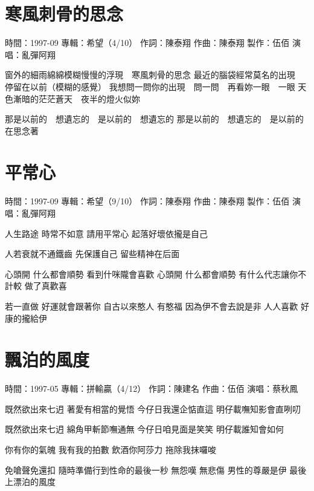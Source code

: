 \documentclass[UTF8,a4paper,oneside,twocolumn,12pt]{ctexbook}
\newcommand{\infopair}[2]{\textbullet #1：#2}
\newcommand{\zc}[1][伍佰]{\infopair{作詞}{#1}}
\newcommand{\zq}[1][伍佰]{\infopair{作曲}{#1}}
\newcommand{\zj}[1]{\infopair{專輯}{#1}}
\newcommand{\zz}[1]{\infopair{製作}{#1}}
\newcommand{\sj}[1]{\infopair{時間}{#1}}
\newenvironment{info}{\begin{flushleft}\kaishu
	}
	{\end{flushleft}\normalsize\yahei\par}
\newenvironment{lyric}{
	}
{}
\begin{document}
\section{寒風刺骨的思念}
\begin{info}
	\sj{1997-09}
	\zj{希望（4/10）}
	\zc[陳泰翔]
	\zq[陳泰翔]
	\zz{伍佰}
	\infopair{演唱}{亂彈阿翔}
\end{info}
\begin{lyric}
	窗外的細雨綿綿模糊慢慢的浮現　寒風刺骨的思念
	最近的腦袋經常莫名的出現　停留在以前（模糊的感覺）
	我想問一問你的出現　問一問　再看妳一眼　一眼
	天色漸暗的茫茫蒼天　夜半的燈火似妳

	那是以前的　想遺忘的　是以前的　想遺忘的
	那是以前的　想遺忘的　是以前的　在思念著
\end{lyric}

\section{平常心}
\begin{info}
	\sj{1997-09}
	\zj{希望（9/10）}
	\zc[陳泰翔]
	\zq[陳泰翔]
	\zz{伍佰}
	\infopair{演唱}{亂彈阿翔}
\end{info}
\begin{lyric}
	人生路途 時常不如意 請用平常心
	起落好壞依攏是自己

	人若衰就不通鐵齒 先保護自己
	留些精神在后面

	心頭開 什么都會順勢
	看到什咪隴會喜歡
	心頭開 什么都會順勢
	有什么代志讓你不計較 做了真歡喜

	若一直做 好運就會跟著你
	自古以來憨人 有憨福
	因為伊不會去說是非 人人喜歡
	好康的攏給伊
\end{lyric}

\section{飄泊的風度}
\begin{info}
	\sj{1997-05}
	\zj{拼輸贏（4/12）}
	\zc[陳建名]
	\zq
	\infopair{演唱}{蔡秋鳳}
\end{info}
\begin{lyric}
	既然欲出來七迌 著愛有相當的覺悟
	今仔日我還企惦直這 明仔載嘸知影會直咧叨

	既然欲出來七迌 綿角甲斬節嘸通無
	今仔日咱見面是笑笑 明仔載誰知會如何

	你有你的氣魄 我有我的拍數
	飲酒你阿莎力 拖除我抹囉唆

	免嗆聲免還扣 隨時準備行到性命的最後一秒
	無怨嘆 無悲傷
	男性的尊嚴是伊 最後上漂泊的風度
\end{lyric}
\end{document}
